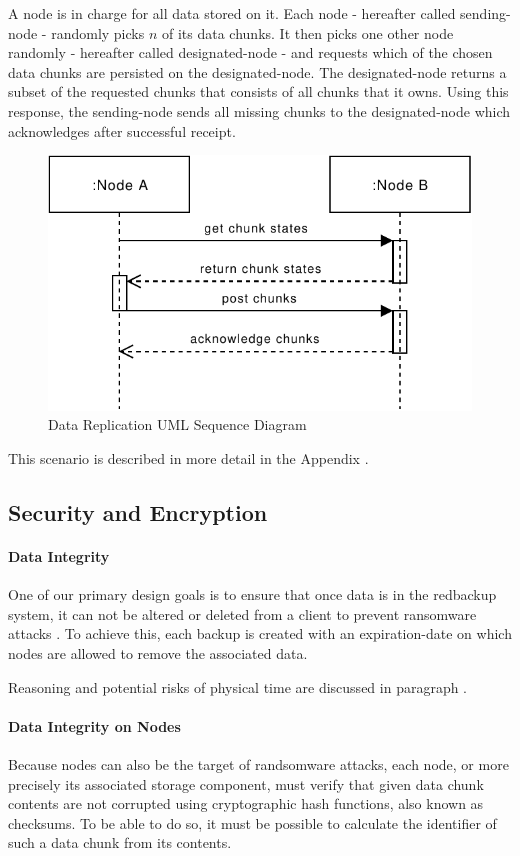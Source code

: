 A \gls{node} is in charge for all data stored on it. Each \gls{node} - hereafter called \gls{sending-node} - randomly picks $n$ of its data \glspl{chunk}. It then picks one other \gls{node} randomly - hereafter called \gls{designated-node} - and requests which of the chosen data \glspl{chunk} are persisted on the \gls{designated-node}. The \gls{designated-node} returns a subset of the requested \glspl{chunk} that consists of all \glspl{chunk} that it owns. Using this response, the \gls{sending-node} sends all missing \glspl{chunk} to the \gls{designated-node} which acknowledges after successful receipt.

\begin{figure}[h]
    \centering
    \includegraphics[width=0.6\linewidth]{resources/data_replication.pdf}
    \caption{Data Replication UML Sequence Diagram}
\end{figure}

This scenario is described in more detail in the Appendix .

\subsection{Security and Encryption}\label{sec:security-and-encryption}
\paragraph{Data Integrity} One of our primary design goals is to ensure that once data is in the redbackup system, it can not be altered or deleted from a \gls{client} to prevent ransomware attacks \cite{young-cryptovirology}. To achieve this, each backup is created with an \gls{expiration-date} on which \glspl{node} are allowed to remove the associated data. 

Reasoning and potential risks of physical time are discussed in paragraph .

\paragraph{Data Integrity on Nodes} Because \glspl{node} can also be the target of randsomware attacks, each \gls{node}, or more precisely its associated \gls{storage} component, must verify that given data \gls{chunk} contents are not corrupted using cryptographic hash functions, also known as checksums. To be able to do so, it must be possible to calculate the identifier of such a data \gls{chunk} from its contents.


